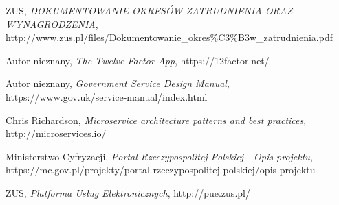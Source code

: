 \documentclass[licencjacka]{pracamgr}
\begin{document}
\begin{thebibliography}{99}

 ZUS, \textit{DOKUMENTOWANIE OKRESÓW ZATRUDNIENIA ORAZ
	WYNAGRODZENIA}, http://www.zus.pl/files/Dokumentowanie\_okres\%C3\%B3w\_zatrudnienia.pdf

 Autor nieznany, \textit{The Twelve-Factor App}, https://12factor.net/

 Autor nieznany, \textit{Government Service Design Manual},
https://www.gov.uk/service-manual/index.html

 Chris Richardson, \textit{Microservice architecture patterns and best practices},
http://microservices.io/

 Ministerstwo Cyfryzacji, \textit{Portal Rzeczypospolitej Polskiej - Opis projektu},
https://mc.gov.pl/projekty/portal-rzeczypospolitej-polskiej/opis-projektu

 ZUS, \textit{Platforma Usług Elektronicznych},
http://pue.zus.pl/

\end{thebibliography}
\end{document}
